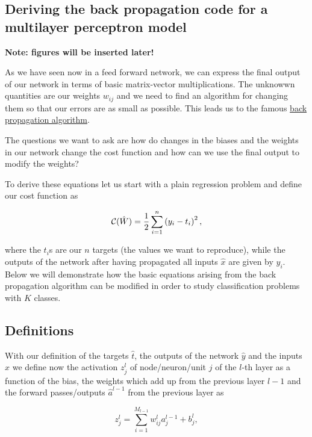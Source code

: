 \documentclass[11pt]{article}
\begin{document}
\hypertarget{deriving-the-back-propagation-code-for-a-multilayer-perceptron-model}{%
\subsection{Deriving the back propagation code for a multilayer
perceptron
model}\label{deriving-the-back-propagation-code-for-a-multilayer-perceptron-model}}

\textbf{Note: figures will be inserted later!}

As we have seen now in a feed forward network, we can express the final
output of our network in terms of basic matrix-vector multiplications.
The unknowwn quantities are our weights \(w_{ij}\) and we need to find
an algorithm for changing them so that our errors are as small as
possible. This leads us to the famous
\href{https://www.nature.com/articles/323533a0}{back propagation
algorithm}.

The questions we want to ask are how do changes in the biases and the
weights in our network change the cost function and how can we use the
final output to modify the weights?

To derive these equations let us start with a plain regression problem
and define our cost function as

    \[
{\cal C}(\hat{W})  =  \frac{1}{2}\sum_{i=1}^n\left(y_i - t_i\right)^2,
\]

    where the \(t_i\)s are our \(n\) targets (the values we want to
reproduce), while the outputs of the network after having propagated all
inputs \(\hat{x}\) are given by \(y_i\). Below we will demonstrate how
the basic equations arising from the back propagation algorithm can be
modified in order to study classification problems with \(K\) classes.

\hypertarget{definitions}{%
\subsection{Definitions}\label{definitions}}

With our definition of the targets \(\hat{t}\), the outputs of the
network \(\hat{y}\) and the inputs \(\hat{x}\) we define now the
activation \(z_j^l\) of node/neuron/unit \(j\) of the \(l\)-th layer as
a function of the bias, the weights which add up from the previous layer
\(l-1\) and the forward passes/outputs \(\hat{a}^{l-1}\) from the
previous layer as

    \[
z_j^l = \sum_{i=1}^{M_{l-1}}w_{ij}^la_j^{l-1}+b_j^l,
\]
\end{document}
